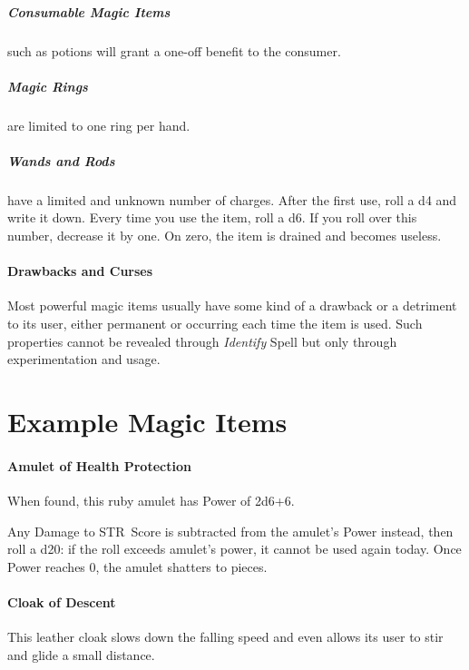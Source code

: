 \documentclass[itdr]{subfiles}
\begin{document}
\vfill

\subparagraph{Consumable Magic Items} such as potions will grant a one-off benefit to the consumer.

\vfill

\subparagraph{Magic Rings} are limited to one ring per hand.

\vfill

\subparagraph{Wands and Rods} have a limited and unknown number of charges. After the first use, roll a d4 and write it down. Every time you use the item, roll a d6. If you roll over this number, decrease it by one. On zero, the item is drained and becomes useless.

\vfill

\paragraph{Drawbacks and Curses}
Most powerful magic items usually have some kind of a drawback or a detriment to its user, either \mbox{permanent} or occurring each time the item is used. Such properties cannot be revealed through \textit{Identify} Spell but only through experimentation and usage.

\vfill
{}
\vfill
\break


\section{Example Magic Items}

\paragraph{Amulet of Health Protection}
When found, this ruby amulet has Power of 2d6+6.

Any Damage to STR~Score is subtracted from the amulet's Power instead, then roll a d20: if the roll exceeds amulet's power, it cannot be used again today. Once Power reaches 0, the amulet shatters to pieces.

\vfill
\paragraph{Cloak of Descent}
This leather cloak slows down the falling speed and even allows its user to stir and glide a small distance.
\end{document}
